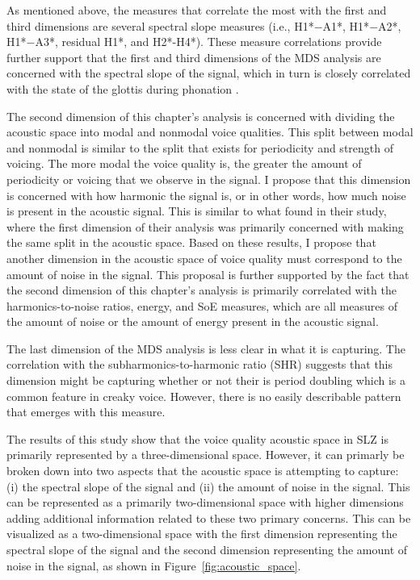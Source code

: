 As mentioned above, the measures that correlate the most with the first and third dimensions are several spectral slope measures (i.e., H1*$-$A1*, H1*$-$A2*, H1*$-$A3*, residual H1*, and H2*-H4*). These measure correlations provide further support that the first and third dimensions of the MDS analysis are concerned with the spectral slope of the signal, which in turn is closely correlated with the state of the glottis during phonation \citep{holmbergComparisonsAerodynamicElectroglottographic1995,kreimanMeasuresGlottalSource2007,garellekModelingVoiceSource2016,garellekPhoneticsVoice2019,chaiH1H2AcousticMeasure2022}.

The second dimension of this chapter's analysis is concerned with dividing the acoustic space into modal and nonmodal voice qualities. This split between modal and nonmodal is similar to the split that exists for periodicity and strength of voicing. The more modal the voice quality is, the greater the amount of periodicity or voicing that we observe in the signal. I propose that this dimension is concerned with how harmonic the signal is, or in other words, how much noise is present in the acoustic signal. This is similar to what \citet{keatingCrosslanguageAcousticSpace2023} found in their study, where the first dimension of their analysis was primarily concerned with making the same split in the acoustic space. Based on these results, I propose that another dimension in the acoustic space of voice quality must correspond to the amount of noise in the signal. This proposal is further supported by the fact that the second dimension of this chapter's analysis is primarily correlated with the harmonics-to-noise ratios, energy, and SoE measures, which are all measures of the amount of noise or the amount of energy present in the acoustic signal. 

The last dimension of the MDS analysis is less clear in what it is capturing. The correlation with the subharmonics-to-harmonic ratio (SHR) suggests that this dimension might be capturing whether or not their is period doubling which is a common feature in creaky voice. However, there is no easily describable pattern that emerges with this measure. 

The results of this study show that the voice quality acoustic space in SLZ is primarily represented by a three-dimensional space. However, it can primarly be broken down into two aspects that the acoustic space is attempting to capture: (i) the spectral slope of the signal and (ii) the amount of noise in the signal. This can be represented as a primarily two-dimensional space with higher dimensions adding additional information related to these two primary concerns. This can be visualized as a two-dimensional space with the first dimension representing the spectral slope of the signal and the second dimension representing the amount of noise in the signal, as shown in Figure~\ref{fig:acoustic_space}.

